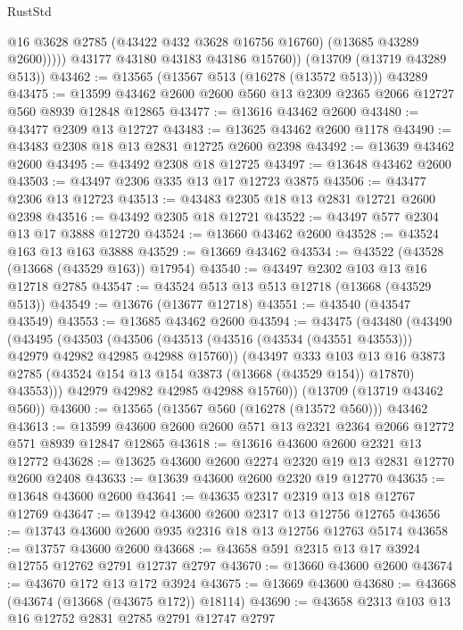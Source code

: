 \begin{lexlean}{RustStd}
\begin{coremodule}
                @16
                @3628
                @2785
                (@43422 @432 @3628 @16756 @16760)
                (@13685 @43289 @2600)))))
        @43177
        @43180
        @43183
        @43186
        @15760))
    (@13709 (@13719 @43289 @513))
@43462 := @13565 (@13567 @513 (@16278 (@13572 @513))) @43289
@43475 := @13599 @43462 @2600 @2600 @560 @13 @2309 @2365 @2066 @12727 @560 @8939 @12848 @12865
@43477 := @13616 @43462 @2600
@43480 := @43477 @2309 @13 @12727
@43483 := @13625 @43462 @2600 @1178
@43490 := @43483 @2308 @18 @13 @2831 @12725 @2600 @2398
@43492 := @13639 @43462 @2600
@43495 := @43492 @2308 @18 @12725
@43497 := @13648 @43462 @2600
@43503 := @43497 @2306 @335 @13 @17 @12723 @3875
@43506 := @43477 @2306 @13 @12723
@43513 := @43483 @2305 @18 @13 @2831 @12721 @2600 @2398
@43516 := @43492 @2305 @18 @12721
@43522 := @43497 @577 @2304 @13 @17 @3888 @12720
@43524 := @13660 @43462 @2600
@43528 := @43524 @163 @13 @163 @3888
@43529 := @13669 @43462
@43534 := @43522 (@43528 (@13668 (@43529 @163)) @17954)
@43540 := @43497 @2302 @103 @13 @16 @12718 @2785
@43547 := @43524 @513 @13 @513 @12718 (@13668 (@43529 @513))
@43549 := @13676 (@13677 @12718)
@43551 := @43540 (@43547 @43549)
@43553 := @13685 @43462 @2600
@43594 := @43475
    (@43480
      (@43490
        (@43495
          (@43503
            (@43506 (@43513 (@43516 (@43534 (@43551 @43553))) @42979 @42982 @42985 @42988 @15760))
            (@43497
              @333
              @103
              @13
              @16
              @3873
              @2785
              (@43524 @154 @13 @154 @3873 (@13668 (@43529 @154)) @17870)
              @43553)))
        @42979
        @42982
        @42985
        @42988
        @15760))
    (@13709 (@13719 @43462 @560))
@43600 := @13565 (@13567 @560 (@16278 (@13572 @560))) @43462
@43613 := @13599 @43600 @2600 @2600 @571 @13 @2321 @2364 @2066 @12772 @571 @8939 @12847 @12865
@43618 := @13616 @43600 @2600 @2321 @13 @12772
@43628 := @13625 @43600 @2600 @2274 @2320 @19 @13 @2831 @12770 @2600 @2408
@43633 := @13639 @43600 @2600 @2320 @19 @12770
@43635 := @13648 @43600 @2600
@43641 := @43635 @2317 @2319 @13 @18 @12767 @12769
@43647 := @13942 @43600 @2600 @2317 @13 @12756 @12765
@43656 := @13743 @43600 @2600 @935 @2316 @18 @13 @12756 @12763 @5174
@43658 := @13757 @43600 @2600
@43668 := @43658 @591 @2315 @13 @17 @3924 @12755 @12762 @2791 @12737 @2797
@43670 := @13660 @43600 @2600
@43674 := @43670 @172 @13 @172 @3924
@43675 := @13669 @43600
@43680 := @43668 (@43674 (@13668 (@43675 @172)) @18114)
@43690 := @43658 @2313 @103 @13 @16 @12752 @2831 @2785 @2791 @12747 @2797

\end{coremodule}
\end{lexlean}
